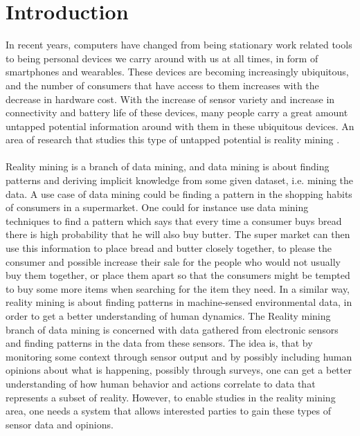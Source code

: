 \chapter{Introduction}
\label{cha:introduction}

In recent years, computers have changed from being stationary work related tools to being personal devices we carry around with us at all times, in form of smartphones and wearables. These devices are becoming increasingly ubiquitous, and the number of consumers that have access to them increases with the decrease in hardware cost. With the increase of sensor variety and increase in connectivity and battery life of these devices, many people carry a great amount untapped potential information around with them in these ubiquitous devices.  An area of research that studies this type of untapped potential is reality mining \parencite{eagle2006_reality_mining_definition}.
\\\\
Reality mining is a branch of data mining, and data mining is about finding patterns and deriving implicit knowledge from some given dataset, i.e. mining the data. A use case of data mining could be finding a pattern in the shopping habits of consumers in a supermarket. One could for instance use data mining techniques to find a pattern which says that every time a consumer buys bread there is high probability that he will also buy butter.
The super market can then use this information to place bread and butter closely together, to please the consumer and possible increase their sale for the people who would not usually buy them together, or place them apart so that the consumers might be tempted to buy some more items when searching for the item they need. In a similar way, reality mining is about finding patterns in machine-sensed environmental data, in order to get a better understanding of human dynamics. The Reality mining branch of data mining is concerned with data gathered from electronic sensors and finding patterns in the data from these sensors. The idea is, that by monitoring some context through sensor output and by possibly including human opinions about what is happening, possibly through surveys, one can get a better understanding of how human behavior and actions correlate to data that represents a subset of reality. However, to enable studies in the reality mining area, one needs a system that allows interested parties to gain these types of sensor data and opinions. 
